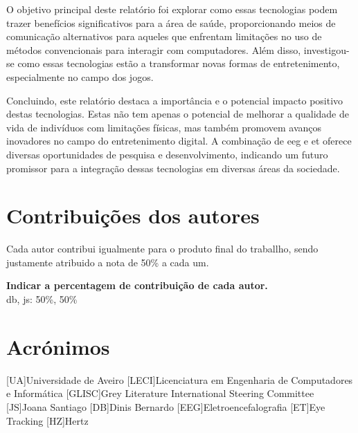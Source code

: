 \documentclass{report}
\begin{document}
O objetivo principal deste relatório foi explorar como essas tecnologias podem trazer benefícios significativos para a área de saúde, proporcionando meios de comunicação alternativos para aqueles que enfrentam limitações no uso de métodos convencionais para interagir com computadores. Além disso, investigou-se como essas tecnologias estão a transformar novas formas de entretenimento, especialmente no campo dos jogos.

Concluindo, este relatório destaca a importância e o potencial impacto positivo destas tecnologias. Estas não tem apenas o potencial de melhorar a qualidade de vida de indivíduos com limitações físicas, mas também promovem avanços inovadores no campo do entretenimento digital. A combinação de \ac{eeg} e \ac{et} oferece diversas oportunidades de pesquisa e desenvolvimento, indicando um futuro promissor para a integração dessas tecnologias em diversas áreas da sociedade.
\chapter*{Contribuições dos autores}
Cada autor contribui igualmente para o produto final do traballho, sendo justamente atribuido a nota de 50\% a cada um.

\vspace{10pt}
\textbf{Indicar a percentagem de contribuição de cada autor.}\\

\ac{db}, \ac{js}: 50\%, 50\%\\

\chapter*{Acrónimos}
\begin{acronym}
[UA]{Universidade de Aveiro}
[LECI]{Licenciatura em Engenharia de Computadores e Informática}
[GLISC]{Grey Literature International Steering Committee}
[JS]{Joana Santiago}
[DB]{Dinis Bernardo}
[EEG]{Eletroencefalografia}
[ET]{Eye Tracking}
[HZ]{Hertz}
\end{acronym}


\printbibliography
\end{document}
